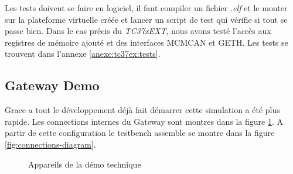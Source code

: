 Les tests doivent se faire en logiciel, il faut compiler un fichier \textit{.elf} et le monter sur la plateforme virtuelle créée et lancer un script de test qui vérifie si tout se passe bien. Dans le cas précis du \textit{TC37xEXT}, nous avons test\'e l'accès aux registres de mémoire ajout\'e et des interfaces MCMCAN et GETH. Les tests se trouvent dans l'annexe \ref{anexe:tc37ex:tests}. 

\subsection{Gateway Demo} 

  

Grace a tout le développement déjà fait démarrer cette simulation a été plus rapide. Les connections internes du Gateway sont montres dans la figure \ref{fig:devices-diagram}. A partir de cette configuration le testbench assemble se montre dans la figure \ref{fig:connections-diagram}.  

  

\begin{figure}[!htb] 

    \centering 



    \caption{Appareils de la démo technique} 

    \label{fig:devices-diagram} 

\end{figure} 

